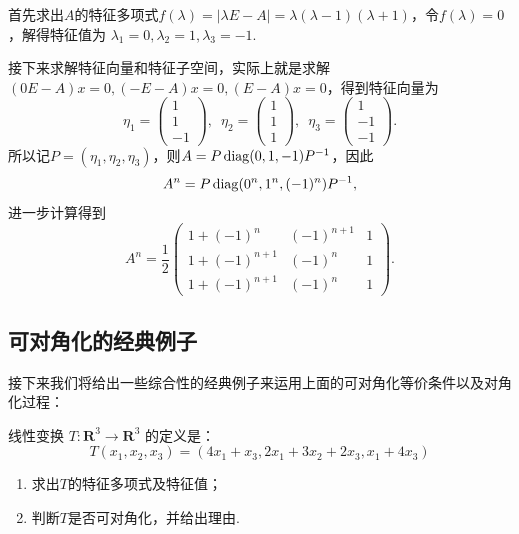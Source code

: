 \begin{solution}
    首先求出$A$的特征多项式$f(\lambda)=|\lambda E-A|=\lambda(\lambda-1)(\lambda+1)$，令$f(\lambda)=0$，解得特征值为 $\lambda_1=0,\lambda_2=1,\lambda_3=-1$.

    接下来求解特征向量和特征子空间，实际上就是求解$(0E-A)x=0,(-E-A)x=0,(E-A)x=0$，得到特征向量为
    \[\eta_1=\begin{pmatrix}
            1 \\ 1 \\ -1
        \end{pmatrix},\enspace \eta_2=\begin{pmatrix}
            1 \\ 1 \\ 1
        \end{pmatrix},\enspace \eta_3=\begin{pmatrix}
            1 \\ -1 \\ -1
        \end{pmatrix}.\]
    所以记$P=(\eta_1,\eta_2,\eta_3)$，则$A=P\operatorname{diag}(0,1,-1)P^{-1}$，因此
    \[A^n=P\operatorname{diag}(0^n,1^n,(-1)^n)P^{-1},\]
    进一步计算得到
    \[A^n=\frac{1}{2}\begin{pmatrix}
            1+(-1)^n     & (-1)^{n+1} & 1 \\
            1+(-1)^{n+1} & (-1)^n     & 1 \\
            1+(-1)^{n+1} & (-1)^n     & 1
        \end{pmatrix}.\]
\end{solution}

\subsection{可对角化的经典例子}

接下来我们将给出一些综合性的经典例子来运用上面的可对角化等价条件以及对角化过程：
\begin{example}{}{}
    线性变换 $T : \mathbf{R}^3 \to \mathbf{R}^3$ 的定义是：
    \[T(x_1,x_2,x_3)=(4x_1+x_3,2x_1+3x_2+2x_3,x_1+4x_3)\]
    \begin{enumerate}
        \item 求出$T$的特征多项式及特征值；

        \item 判断$T$是否可对角化，并给出理由.
    \end{enumerate}
\end{example}

